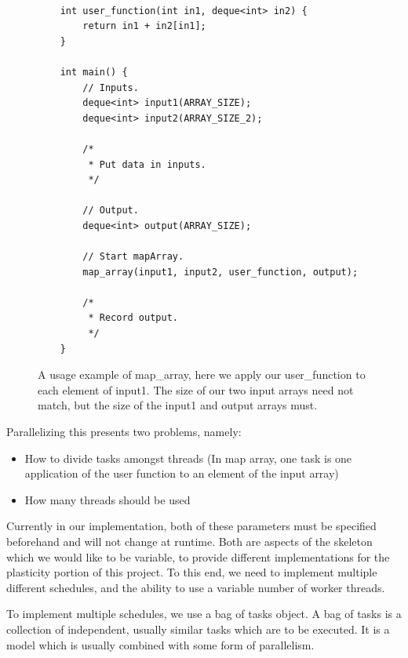 \begin{figure}
	\begin{lstlisting}

	int user_function(int in1, deque<int> in2) {
		return in1 + in2[in1];
	}

	int main() {
		// Inputs.
		deque<int> input1(ARRAY_SIZE);
		deque<int> input2(ARRAY_SIZE_2);

		/*
		 * Put data in inputs.
		 */

		// Output.
		deque<int> output(ARRAY_SIZE);

		// Start mapArray.
		map_array(input1, input2, user_function, output);

		/*
		 * Record output.
		 */
	}

	\end{lstlisting}

	\caption{A usage example of map\_array, here we apply our user\_function to each element of input1. The size of our two input arrays need not match, but the size of the input1 and output arrays must.}
	\label{fig:map_array_usage_example}
\end{figure}



\begin{minipage}{\textwidth}

Parallelizing this presents two problems, namely:

\begin{itemize}
	\item How to divide tasks amongst threads (In map array, one task is one application of the user function to an element of the input array)
	\item How many threads should be used
\end{itemize}

\end{minipage}
 
Currently in our implementation, both of these parameters must be specified beforehand and will not change at runtime. Both are aspects of the skeleton which we would like to be variable, to provide different implementations for the plasticity portion of this project. To this end, we need to implement multiple different schedules, and the ability to use a variable number of worker threads.

To implement multiple schedules, we use a bag of tasks object. A bag of tasks is a collection of independent, usually similar tasks which are to be executed. It is a model which is usually combined with some form of parallelism.

